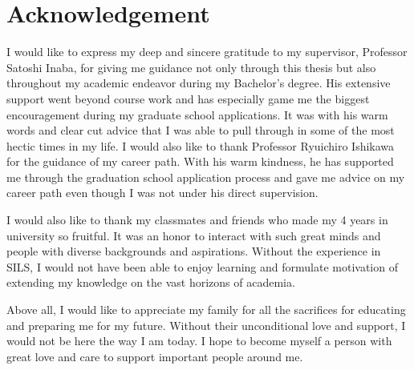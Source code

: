 \thispagestyle{plain}
\section*{Acknowledgement}

I would like to express my deep and sincere gratitude to my supervisor, Professor Satoshi Inaba, for giving me guidance not only through this thesis but also throughout my academic endeavor during my Bachelor's degree. His extensive support went beyond course work and has especially game me the biggest encouragement during my graduate school applications. It was with his warm words and clear cut advice that I was able to pull through in some of the most hectic times in my life. I would also like to thank Professor Ryuichiro Ishikawa for the guidance of my career path. With his warm kindness, he has supported me through the graduation school application process and gave me advice on my career path even though I was not under his direct supervision. 

I would also like to thank my classmates and friends who made my 4 years in university so fruitful. It was an honor to interact with such great minds and people with diverse backgrounds and aspirations. Without the experience in SILS, I would not have been able to enjoy learning and formulate motivation of extending my knowledge on the vast horizons of academia. 

Above all, I would like to appreciate my family for all the sacrifices for educating and preparing me for my future. Without their unconditional love and support, I would not be here the way I am today. I hope to become myself a person with great love and care to support important people around me. 
